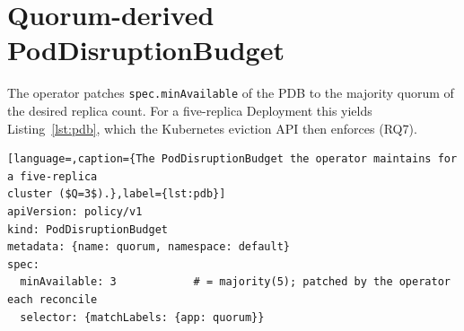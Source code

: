 \documentclass[AMA,Times1COL]{WileyNJDv5}
\begin{document}
\section{Quorum-derived PodDisruptionBudget}\label{app:pdb}
The operator patches \texttt{spec.minAvailable} of the PDB to the majority quorum of the desired replica
count. For a five-replica Deployment this yields Listing~\ref{lst:pdb}, which the Kubernetes eviction
API then enforces (RQ7).

\begin{lstlisting}[language=,caption={The PodDisruptionBudget the operator maintains for a five-replica
cluster ($Q=3$).},label={lst:pdb}]
apiVersion: policy/v1
kind: PodDisruptionBudget
metadata: {name: quorum, namespace: default}
spec:
  minAvailable: 3            # = majority(5); patched by the operator each reconcile
  selector: {matchLabels: {app: quorum}}
\end{lstlisting}
\end{document}
